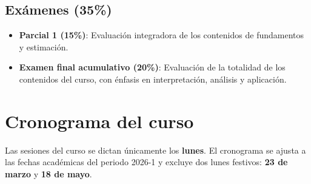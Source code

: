 \documentclass[
  11pt,
]{article}
\providecommand{\tightlist}{%
  \setlength{\itemsep}{0pt}\setlength{\parskip}{0pt}}
\begin{document}
\hypertarget{exuxe1menes-35}{%
\subsection{Exámenes (35\%)}\label{exuxe1menes-35}}

\begin{itemize}
\tightlist
\item
  \textbf{Parcial 1 (15\%)}: Evaluación integradora de los contenidos de
  fundamentos y estimación.
\item
  \textbf{Examen final acumulativo (20\%)}: Evaluación de la totalidad
  de los contenidos del curso, con énfasis en interpretación, análisis y
  aplicación.
\end{itemize}

\hypertarget{cronograma-del-curso}{%
\section{Cronograma del curso}\label{cronograma-del-curso}}

Las sesiones del curso se dictan únicamente los \textbf{lunes}. El
cronograma se ajusta a las fechas académicas del periodo 2026-1 y
excluye dos lunes festivos: \textbf{23 de marzo} y \textbf{18 de mayo}.
\end{document}

